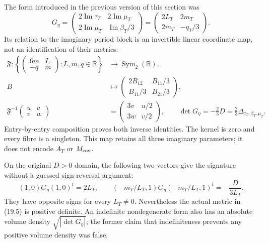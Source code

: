 \documentclass[
]{article}
\begin{document}
The form introduced in the previous version of this section was \[
G_\eta=
\begin{pmatrix}
2\operatorname{Im}\tau_T&2\operatorname{Im}\mu_T\\
2\operatorname{Im}\mu_T&\operatorname{Im}\beta_T/3
\end{pmatrix}
=\begin{pmatrix}2L_T&2m_T\\2m_T&-q_T/3\end{pmatrix}.
                                                               \tag{19.6}
\] Its relation to the imaginary period block is an invertible linear
coordinate map, not an identification of their metrics: \[
\begin{aligned}
\mathfrak F:
\left\{\begin{pmatrix}6m&L\\-q&m\end{pmatrix}:L,m,q\in\mathbb R\right\}
 &\longrightarrow \operatorname{Sym}_2(\mathbb R),\\
B&\longmapsto
 \begin{pmatrix}2B_{12}&B_{11}/3\\B_{11}/3&B_{21}/3\end{pmatrix},\\
\mathfrak F^{-1}\begin{pmatrix}u&v\\v&w\end{pmatrix}
 &=\begin{pmatrix}3v&u/2\\3w&v/2\end{pmatrix},\qquad
\det G_\eta=-\frac23D=\frac23\Delta_{\tau_T,\beta_T,\mu_T}.
\end{aligned}                                                    \tag{19.7}
\] Entry-by-entry composition proves both inverse identities. The kernel
is zero and every fibre is a singleton. This map retains all three
imaginary parameters; it does not encode \(A_T\) or \(M_{\rm cov}\).

On the original \(D>0\) domain, the following two vectors give the
signature without a guessed sign-reversal argument: \[
(1,0)G_\eta(1,0)^t=2L_T,\qquad
(-m_T/L_T,1)G_\eta(-m_T/L_T,1)^t=-\frac{D}{3L_T}.
                                                               \tag{19.8}
\] They have opposite signs for every \(L_T\ne0\). Nevertheless the
actual metric in (19.5) is positive definite. An indefinite
nondegenerate form also has an absolute volume density
\(\sqrt{|\det G_\eta|}\); the former claim that indefiniteness prevents
any positive volume density was false.
\end{document}
